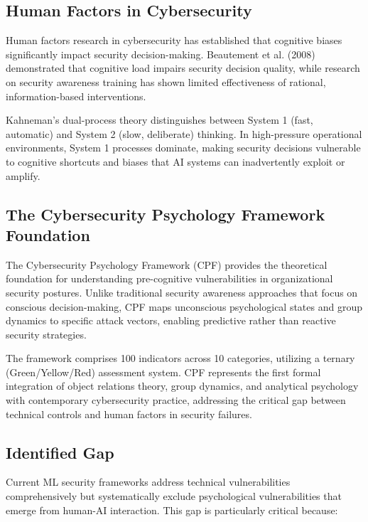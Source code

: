 \documentclass[11pt,a4paper]{article}
\begin{document}
\subsection{Human Factors in Cybersecurity}

Human factors research in cybersecurity has established that cognitive biases significantly impact security decision-making. Beautement et al. (2008) demonstrated that cognitive load impairs security decision quality\cite{beautement2008}, while research on security awareness training has shown limited effectiveness of rational, information-based interventions\cite{sans2023}.

Kahneman's dual-process theory distinguishes between System 1 (fast, automatic) and System 2 (slow, deliberate) thinking\cite{kahneman2011}. In high-pressure operational environments, System 1 processes dominate, making security decisions vulnerable to cognitive shortcuts and biases that AI systems can inadvertently exploit or amplify.

\subsection{The Cybersecurity Psychology Framework Foundation}

The Cybersecurity Psychology Framework (CPF) provides the theoretical foundation for understanding pre-cognitive vulnerabilities in organizational security postures\cite{canale2025}. Unlike traditional security awareness approaches that focus on conscious decision-making, CPF maps unconscious psychological states and group dynamics to specific attack vectors, enabling predictive rather than reactive security strategies.

The framework comprises 100 indicators across 10 categories, utilizing a ternary (Green/Yellow/Red) assessment system. CPF represents the first formal integration of object relations theory, group dynamics, and analytical psychology with contemporary cybersecurity practice, addressing the critical gap between technical controls and human factors in security failures.

\subsection{Identified Gap}

Current ML security frameworks address technical vulnerabilities comprehensively but systematically exclude psychological vulnerabilities that emerge from human-AI interaction. This gap is particularly critical because:
\end{document}
